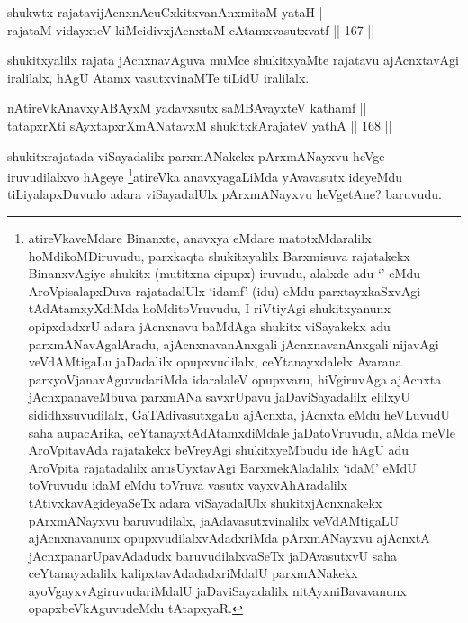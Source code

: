 
\begin{shl}
shukwtx rajatavijAcnxnAcuCxkitxvanAnxmitaM yataH | \\
rajataM vidayxteV kiMcidivxjAcnxtaM cA\s \s tamxvasutxvatf \hfill||  167 ||  
\end{shl}

\begin{artha}
shukitxyalilx rajata jAcnxnavAguva muMce shukitxyaMte rajatavu ajAcnxtavAgi iralilalx, hAgU Atamx vasutxvinaMTe tiLidU iralilalx.
\end{artha}

\begin{shl}
nAtireVkAnavxyABAyxM yadavxsutx saMBAvayxteV kathamf ||  \\
tatapxrXti sAyxtapxrXmANatavxM shukitxkArajateV yathA \hfill||  168 ||  
\end{shl}

\begin{artha}
shukitxrajatada viSayadalilx parxmANakekx pArxmANayxvu heVge iruvudilalxvo hAgeye \footnote{atireVkaveMdare Binanxte, anavxya eMdare matotxMdaralilx hoMdikoMDiruvudu, parxkaqta shukitxyalilx Barxmisuva rajatakekx BinanxvAgiye shukitx (mutitxna cipupx) iruvudu, alalxde adu `\stext' eMdu AroVpisalapxDuva rajatadalUlx `idamf' (idu) eMdu parxtayxkaSxvAgi tAdAtamxyXdiMda hoMditoVruvudu, I riVtiyAgi shukitxyanunx opipxdadxrU adara jAcnxnavu baMdAga shukitx viSayakekx adu parxmANavAgalAradu, ajAcnxnavanAnxgali jAcnxnavanAnxgali nijavAgi veVdAMtigaLu jaDadalilx opupxvudilalx, ceYtanayxdalelx Avarana parxyoVjanavAguvudariMda idaralaleV opupxvaru, hiVgiruvAga ajAcnxta jAcnxpanaveMbuva parxmANa savxrUpavu jaDaviSayadalilx elilxyU sididhxsuvudilalx, GaTAdivasutxgaLu ajAcnxta, jAcnxta eMdu heVLuvudU saha aupacArika, ceYtanayxtAdAtamxdiMdale jaDatoVruvudu, aMda meVle AroVpitavAda rajatakekx beVreyAgi shukitxyeMbudu ide hAgU adu AroVpita rajatadalilx anusUyxtavAgi BarxmekAladalilx `idaM' eMdU toVruvudu idaM eMdu toVruva vasutx vayxvAhAradalilx tAtivxkavAgideyaSeTx adara viSayadalUlx shukitxjAcnxnakekx pArxmANayxvu baruvudilalx, jaAdavasutxvinalilx veVdAMtigaLU ajAcnxnavanunx opupxvudilalxvAdadxriMda pArxmANayxvu ajAcnxtA jAcnxpanarUpavAdadudx baruvudilalxvaSeTx jaDAvasutxvU saha ceYtanayxdalilx kalipxtavAdadadxriMdalU parxmANakekx ayoVgayxvAgiruvudariMdalU jaDaviSayadalilx nitAyxniBavavanunx opapxbeVkAguvudeMdu tAtapxyaR.}atireVka anavxyagaLiMda yAvavasutx ideyeMdu tiLiyalapxDuvudo adara viSayadalUlx pArxmANayxvu heVgetAne? baruvudu.
\end{artha}

